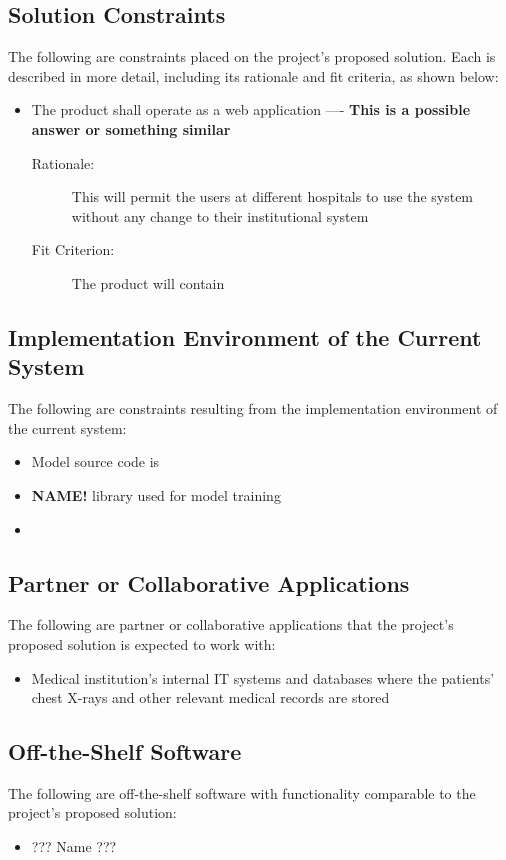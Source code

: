 \documentclass[12pt]{article}
\begin{document}
\subsection{Solution Constraints}
The following are constraints placed on the project’s proposed solution. Each is described in more detail, including its rationale and fit criteria, as shown below:
\begin{itemize}
    \item The product shall operate as a web application  ---- \textbf{This is a possible answer or something similar}
    \begin{description} 
        \item[Rationale:] This will permit the users at different hospitals to use the system without any change to their institutional system
        \item[Fit Criterion:] The product will contain 
    \end{description}
\end{itemize}

\subsection{Implementation Environment of the Current System}
The following are constraints resulting from the implementation environment of the current system:

\begin{itemize}
    \item Model source code is 
    \item \textbf{NAME!} library used for model training
    \item 
\end{itemize}

\subsection{Partner or Collaborative Applications}
The following are partner or collaborative applications that the project’s proposed solution is expected to work with:

\begin{itemize}
    \item Medical institution’s internal IT systems and databases where the patients’ chest X-rays and other relevant medical records are stored
\end{itemize}

\subsection{Off-the-Shelf Software}
The following are off-the-shelf software with functionality comparable to the project’s proposed solution: 
\begin{itemize}
    \item ??? Name ???
\end{itemize}
\end{document}

